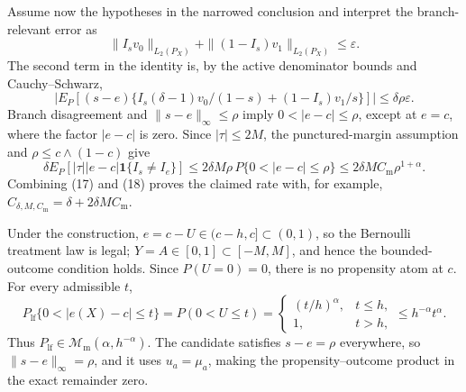 Assume now the hypotheses in the narrowed conclusion and interpret the branch-relevant error as
\begin{equation}
 \|I_s v_0\|_{L_2(P_X)}+\|(1-I_s)v_1\|_{L_2(P_X)}\le\varepsilon.                         \tag{16}
\end{equation}
The second term in the identity is, by the active denominator bounds and Cauchy--Schwarz,
\begin{equation}
 \left|E_P[(s-e)\{I_s(\delta-1)v_0/(1-s)+(1-I_s)v_1/s\}]\right|
 \le\delta\rho\varepsilon.                                                              \tag{17}
\end{equation}
Branch disagreement and \(\|s-e\|_\infty\le\rho\) imply
\(0<|e-c|\le\rho\), except at \(e=c\), where the factor \(|e-c|\) is zero.  Since \(|\tau|\le2M\), the punctured-margin assumption and
\(\rho\le c\wedge(1-c)\) give
\begin{equation}
 \delta E_P[|\tau||e-c|\mathbf1\{I_s\ne I_e\}]
 \le2\delta M\rho\,P\{0<|e-c|\le\rho\}
 \le2\delta M C_{\mathrm m}\rho^{1+\alpha}.                                            \tag{18}
\end{equation}
Combining (17) and (18) proves the claimed rate with, for example,
\(C_{\delta,M,C_{\mathrm m}}=\delta+2\delta M C_{\mathrm m}\).

Under the construction, \(e=c-U\in(c-h,c]\subset(0,1)\), so the Bernoulli treatment law is legal; \(Y=A\in[0,1]\subset[-M,M]\), and hence the bounded-outcome condition holds.  Since \(P(U=0)=0\), there is no propensity atom at \(c\).  For every admissible \(t\),
\begin{equation}
 P_{\mathrm{lf}}\{0<|e(X)-c|\le t\}
 =P(0<U\le t)
 =\begin{cases}(t/h)^\alpha,&t\le h,\\1,&t>h,
 \end{cases}
 \le h^{-\alpha}t^\alpha.                                                               \tag{19}
\end{equation}
Thus \(P_{\mathrm{lf}}\in\mathcal M_{\mathrm m}(\alpha,h^{-\alpha})\).  The candidate satisfies \(s-e=\rho\) everywhere, so
\(\|s-e\|_\infty=\rho\), and it uses \(u_a=\mu_a\), making the propensity--outcome product in the exact remainder zero.

